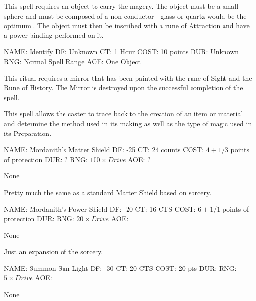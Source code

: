 \bigskip
{}

This spell requires an object to carry the magery. The object
must be a small sphere and must be composed of a non conductor -
glass or quartz would be the optimum . The object must then be
inscribed with a rune of Attraction and have a power binding performed
on it.

\newpage

\spell
NAME: Identify
DF:   Unknown
CT:   1 Hour
COST:  10 points
DUR:  Unknown
RNG:  Normal Spell Range
AOE:  One Object

\bigskip


This ritual requires a mirror that has been painted with
the rune of Sight and the Rune of History. The Mirror is destroyed upon
the successful completion of the spell.

\bigskip


This spell allows the caster to trace back to the creation
of an item or material and determine the method used in its making
as well as the type of magic used in its Preparation.

\newpage

\spell
NAME: Mordanith's Matter Shield
DF:  -25
CT:  24 counts
COST:  \( 4 + 1/3 \) points of protection
DUR: ?
RNG:  \( 100 \times Drive \)
AOE: ?

\bigskip
{}

None

\bigskip
{}

Pretty much the same as a standard Matter Shield based on sorcery.

\newpage

\spell
NAME: Mordanith's Power Shield
DF:  -20
CT:  16 CTS
COST:  \( 6 + 1/1 \) points of protection
DUR:
RNG:  \( 20 \times Drive \)
AOE:

\bigskip
{}

None

\bigskip
{}

Just an expansion of the sorcery.

\newpage

\spell
NAME: Summon Sun Light
DF:  -30
CT:  20 CTS
COST:  20 pts
DUR:
RNG:  \( 5 \times Drive \)
AOE:

\bigskip
{}

None

